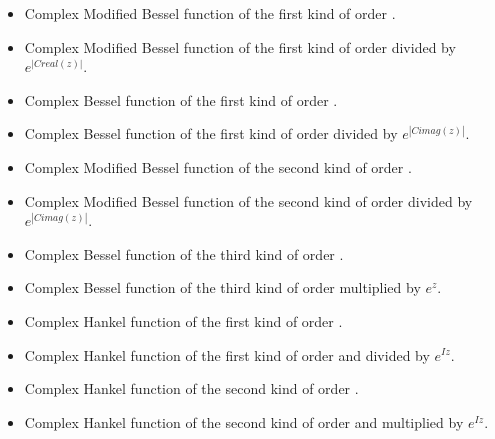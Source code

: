 \begin{itemize}
\item {}
  \sshortdescribe  Complex Modified Bessel function of the first
  kind of order .
\item {}
  \sshortdescribe  Complex Modified Bessel function of the first
  kind of order  divided by $e^{|Creal(z)|}$.
\item {}
  \sshortdescribe  Complex  Bessel function of the first
  kind of order .
\item {}
  \sshortdescribe  Complex  Bessel function of the first
  kind of order  divided by $e^{|Cimag(z)|}$.
\item {}
  \sshortdescribe  Complex Modified Bessel function of the second
  kind of order .
\item {}
  \sshortdescribe  Complex Modified Bessel function of the second
  kind of order  divided by $e^{|Cimag(z)|}$.
\item {}
  \sshortdescribe  Complex Bessel function of the third
  kind of order .
\item {}
  \sshortdescribe  Complex Bessel function of the third
  kind of order  multiplied by $e^{z}$.
\item {}
  \sshortdescribe  Complex Hankel function of the first kind of
  order . 
\item {}
  \sshortdescribe  Complex  Hankel function of the first kind of order
    and divided by $e^{I z}$.
\item {}
  \sshortdescribe  Complex  Hankel function of the second kind of
  order . 
\item {}
  \sshortdescribe  Complex  Hankel function of the second kind of
  order   and multiplied by $e^{I z}$.
\end{itemize}



